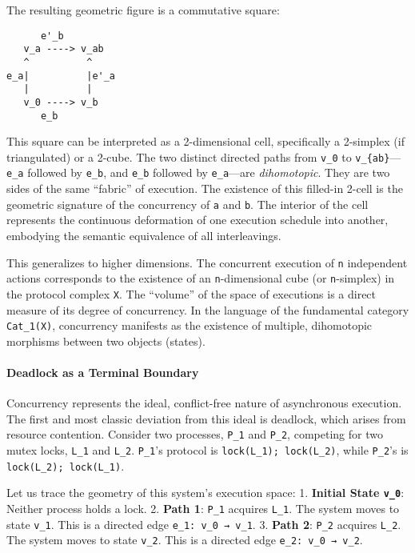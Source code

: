 \documentclass[
]{article}
\begin{document}
The resulting geometric figure is a commutative square:

\begin{verbatim}
      e'_b
   v_a ----> v_ab
   ^          ^
e_a|          |e'_a
   |          |
   v_0 ----> v_b
      e_b
\end{verbatim}

This square can be interpreted as a 2-dimensional cell, specifically a
2-simplex (if triangulated) or a 2-cube. The two distinct directed paths
from \texttt{v\_0} to \texttt{v\_\{ab\}}---\texttt{e\_a} followed by
\texttt{e\textquotesingle{}\_b}, and \texttt{e\_b} followed by
\texttt{e\textquotesingle{}\_a}---are \emph{dihomotopic}. They are two
sides of the same ``fabric'' of execution. The existence of this
filled-in 2-cell is the geometric signature of the concurrency of
\texttt{a} and \texttt{b}. The interior of the cell represents the
continuous deformation of one execution schedule into another, embodying
the semantic equivalence of all interleavings.

This generalizes to higher dimensions. The concurrent execution of
\texttt{n} independent actions corresponds to the existence of an
\texttt{n}-dimensional cube (or \texttt{n}-simplex) in the protocol
complex \texttt{X}. The ``volume'' of the space of executions is a
direct measure of its degree of concurrency. In the language of the
fundamental category \texttt{Cat\_1(X)}, concurrency manifests as the
existence of multiple, dihomotopic morphisms between two objects
(states).

\paragraph{Deadlock as a Terminal
Boundary}\label{deadlock-as-a-terminal-boundary}

Concurrency represents the ideal, conflict-free nature of asynchronous
execution. The first and most classic deviation from this ideal is
deadlock, which arises from resource contention. Consider two processes,
\texttt{P\_1} and \texttt{P\_2}, competing for two mutex locks,
\texttt{L\_1} and \texttt{L\_2}. \texttt{P\_1}'s protocol is
\texttt{lock(L\_1);\ lock(L\_2)}, while \texttt{P\_2}'s is
\texttt{lock(L\_2);\ lock(L\_1)}.

Let us trace the geometry of this system's execution space: 1.
\textbf{Initial State \texttt{v\_0}}: Neither process holds a lock. 2.
\textbf{Path 1}: \texttt{P\_1} acquires \texttt{L\_1}. The system moves
to state \texttt{v\_1}. This is a directed edge
\texttt{e\_1:\ v\_0\ →\ v\_1}. 3. \textbf{Path 2}: \texttt{P\_2}
acquires \texttt{L\_2}. The system moves to state \texttt{v\_2}. This is
a directed edge \texttt{e\_2:\ v\_0\ →\ v\_2}.
\end{document}
